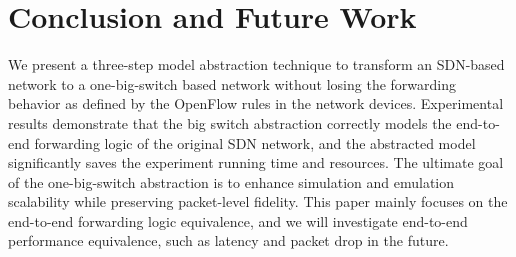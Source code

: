 \section{Conclusion and Future Work}
\label{Sec:conclusion}

We present a three-step model abstraction technique to transform an SDN-based network to a one-big-switch based network without losing the forwarding behavior as defined by the OpenFlow rules in the network devices.
Experimental results demonstrate that the big switch abstraction correctly models the end-to-end forwarding logic of the original SDN network, and the abstracted model significantly saves the experiment running time and resources. The ultimate goal of the one-big-switch abstraction is to enhance simulation and emulation scalability while preserving packet-level fidelity. This paper mainly focuses on the end-to-end forwarding logic equivalence, and we will investigate end-to-end performance equivalence, such as latency and packet drop in the future.
